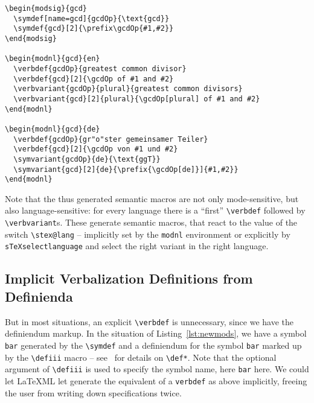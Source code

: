 \documentclass{bluenote}
\def\latexml{{\LaTeX}ML\xspace}
\begin{document}
\begin{lstlisting}[label=lst:gcd,caption=Notation and Verbalization Definitions for
  Greatest Common Divisor]
\begin{modsig}{gcd}
  \symdef[name=gcd]{gcdOp}{\text{gcd}}
  \symdef{gcd}[2]{\prefix\gcdOp{#1,#2}}
\end{modsig}

\begin{modnl}{gcd}{en}
  \verbdef{gcdOp}{greatest common divisor}
  \verbdef{gcd}[2]{\gcdOp of #1 and #2}
  \verbvariant{gcdOp}{plural}{greatest common divisors}
  \verbvariant{gcd}[2]{plural}{\gcdOp[plural] of #1 and #2}
\end{modnl}

\begin{modnl}{gcd}{de}
  \verbdef{gcdOp}{gr"o"ster gemeinsamer Teiler}
  \verbdef{gcd}[2]{\gcdOp von #1 und #2}
  \symvariant{gcdOp}{de}{\text{ggT}}
  \symvariant{gcd}[2]{de}{\prefix{\gcdOp[de]}]{#1,#2}}
\end{modnl}
\end{lstlisting}
Note that the thus generated semantic macros are not only mode-sensitive, but also
language-sensitive: for every language there is a ``first'' \lstinline|\verbdef| followed
by \lstinline|\verbvariant|s. These generate semantic macros, that react to the value of
the switch \lstinline|\stex@lang| -- implicitly set by the \lstinline|modnl| environment
or explicitly by \lstinline|sTeXselectlanguage| and select the right variant in the right
language.

\subsection{Implicit Verbalization Definitions from Definienda}

But in most situations, an explicit \lstinline|\verbdef| is unnecessary, since we have the
definiendum markup. In the situation of Listing~\ref{lst:newmods}, we have a symbol
\lstinline|bar| generated by the \lstinline|\symdef| and a definiendum for the symbol
\lstinline|bar| marked up by the \lstinline|\defiii| macro -- see~\cite{Kohlhase:smms:svn}
for details on \lstinline|\def*|. Note that the optional argument of \lstinline|\defiii|
is used to specify the symbol name, here \lstinline|bar| here. We could let \latexml let
generate the equivalent of a \lstinline|verbdef| as above implicitly, freeing the user
from writing down specifications twice.
\end{document}
